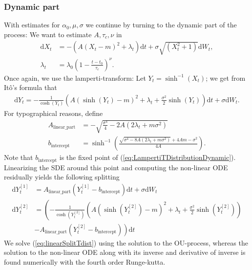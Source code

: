 \subsubsection{Dynamic part}
With estimates for $\alpha_0, \mu, \sigma$ we continue by turning to the dynamic part of the process: We want to estimate $A, \tau_c, \nu$ in
\begin{align}
    \mathrm{d}X_t &= -\left(A(X_t - m)^2 + \lambda_t\right)\mathrm{d}t + \sigma \sqrt{\left(X_t^2 + 1\right)}\mathrm{d}W_t,\\
    \lambda_t &= \lambda_0 \left(1 - \frac{t - t_0}{\tau_c}\right)^\nu.
\end{align}
Once again, we use the lamperti-transform: Let $Y_t = \sinh^{-1}(X_t)$; we get from Itô's formula that
\begin{align}
    \mathrm{d}Y_t = -\frac{1}{\cosh(Y_t)}\left(A\left(\sinh(Y_t) - m\right)^2 + \lambda_t + \frac{\sigma^2}{2}\sinh(Y_t)\right)\mathrm{d}t + \sigma \mathrm{d}W_t. \label{eq:LampertiTDistributionDynamic}
\end{align}
For typographical reasons, define
\begin{align}
    A_{\textrm{linear\_part}} &= -\sqrt{\frac{\sigma^4}{4} - 2A\left(2\lambda_t + m\sigma^2\right)}\\
    b_{\textrm{intercept}} &= \sinh^{-1}\left(\frac{\sqrt{\sigma^4 - 8A\left(2\lambda_t + m \sigma^2\right)} + 4 Am - \sigma^2}{4A}\right).
\end{align}
Note that $b_{\textrm{intercept}}$ is the fixed point of (\ref{eq:LampertiTDistributionDynamic}). Linearizing the SDE around this point and computing the non-linear ODE residually yields the following splitting
\begin{align}
    \mathrm{d}Y_t^{[1]} &= A_{\textrm{linear\_part}}\left(Y_t^{[1]} - b_{\textrm{intercept}}\right)\mathrm{d}t + \sigma \mathrm{d}W_t \label{eq:linearSplitTdist} \\
    \mathrm{d}Y_t^{[2]} &= \left(-\frac{1}{\cosh(Y_t^{[2]})}\left(A\left(\sinh(Y_t^{[2]}) - m\right)^2 + \lambda_t + \frac{\sigma^2}{2}\sinh(Y_t^{[2]})\right)\right.\\
     &\left.- A_{\textrm{linear\_part}}\left(Y_t^{[2]} - b_{\textrm{intercept}}\right)\right)\mathrm{d}t \label{eq:StrangTDiffusionDynamic}
\end{align}
We solve (\ref{eq:linearSplitTdist}) using the solution to the OU-process, whereas the solution to the non-linear ODE along with its inverse and derivative of inverse is found numerically with the fourth order Runge-kutta.
